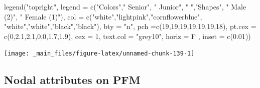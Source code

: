 \documentclass[
  notitlepage,
  onecolumn,
  openany]{book}
\newenvironment{Shaded}{\begin{snugshade}}{\end{snugshade}}
\newcommand{\AttributeTok}[1]{\textcolor[rgb]{0.77,0.63,0.00}{#1}}
\newcommand{\DecValTok}[1]{\textcolor[rgb]{0.00,0.00,0.81}{#1}}
\newcommand{\FloatTok}[1]{\textcolor[rgb]{0.00,0.00,0.81}{#1}}
\newcommand{\FunctionTok}[1]{\textcolor[rgb]{0.00,0.00,0.00}{#1}}
\newcommand{\NormalTok}[1]{#1}
\newcommand{\StringTok}[1]{\textcolor[rgb]{0.31,0.60,0.02}{#1}}
\begin{document}
\begin{Shaded}
\begin{Highlighting}[]
\FunctionTok{legend}\NormalTok{(}\StringTok{"topright"}\NormalTok{,}
       \AttributeTok{legend =} \FunctionTok{c}\NormalTok{(}\StringTok{"Colors"}\NormalTok{,}\StringTok{" Senior"}\NormalTok{, }\StringTok{" Junior"}\NormalTok{,}
                  \StringTok{" "}\NormalTok{,}\StringTok{"Shapes"}\NormalTok{, }\StringTok{" Male (2)"}\NormalTok{, }\StringTok{" Female (1)"}\NormalTok{),}
       \AttributeTok{col =} \FunctionTok{c}\NormalTok{(}\StringTok{"white"}\NormalTok{,}\StringTok{"lightpink"}\NormalTok{,}\StringTok{"cornflowerblue"}\NormalTok{,}
               \StringTok{"white"}\NormalTok{,}\StringTok{"white"}\NormalTok{,}\StringTok{"black"}\NormalTok{,}\StringTok{"black"}\NormalTok{), }
       \AttributeTok{bty =} \StringTok{"n"}\NormalTok{, }\AttributeTok{pch =}\FunctionTok{c}\NormalTok{(}\DecValTok{19}\NormalTok{,}\DecValTok{19}\NormalTok{,}\DecValTok{19}\NormalTok{,}\DecValTok{19}\NormalTok{,}\DecValTok{19}\NormalTok{,}\DecValTok{19}\NormalTok{,}\DecValTok{18}\NormalTok{),}
       \AttributeTok{pt.cex =} \FunctionTok{c}\NormalTok{(}\DecValTok{0}\NormalTok{,}\FloatTok{2.1}\NormalTok{,}\FloatTok{2.1}\NormalTok{,}\DecValTok{0}\NormalTok{,}\DecValTok{0}\NormalTok{,}\FloatTok{1.7}\NormalTok{,}\FloatTok{1.9}\NormalTok{), }
       \AttributeTok{cex =} \DecValTok{1}\NormalTok{, }
       \AttributeTok{text.col =} \StringTok{"grey10"}\NormalTok{, }
       \AttributeTok{horiz =}\NormalTok{ F , }
       \AttributeTok{inset =} \FunctionTok{c}\NormalTok{(}\FloatTok{0.01}\NormalTok{))}
\end{Highlighting}
\end{Shaded}

\begin{center}\texttt{[image: \_main\_files/figure-latex/unnamed-chunk-139-1]} \end{center}

\hypertarget{nodal-attributes-on-pfm}{%
\subsection{Nodal attributes on PFM}\label{nodal-attributes-on-pfm}}
\end{document}
